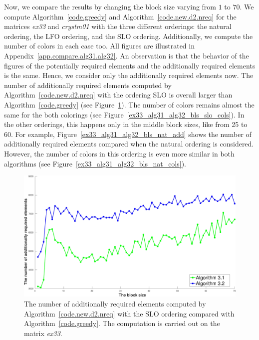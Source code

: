 \documentclass[12pt, twoside,a4paper,toc=bibliography]{scrbook}
\newcommand{\figref}[1]{Figure~\protect\ref{#1}}
\newcommand{\coderef}[1]{Algorithm~\protect\ref{#1}}
\newcommand{\appref}[1]{Appendix~\protect\ref{#1}}
\begin{document}
Now, we compare the results by changing the block size varying from $1$ to $70$.
We compute \coderef{code.greedy} and \coderef{code.new.d2.nreq} for the matrices \textit{ex33}
and \textit{crystm01} with the three different orderings: the natural ordering, the LFO ordering,
and the SLO ordering. Additionally, we compute the number of colors in each case too.
All figures are illustrated in \appref{app.compare.alg31.alg32}.
An observation is that the behavior of the figures of the potentially required elements and
the additionally required elements is the same. Hence, we consider only the additionally
required elements now.
The number of additionally required elements computed by \coderef{code.new.d2.nreq} with the ordering SLO
is overall larger than \coderef{code.greedy} (see \figref{ex33_alg31_alg32_bls_slo_add}).
The number of colors remains almost the same for the both colorings 
(see \figref{ex33_alg31_alg32_bls_slo_cols}). 
In the other orderings, this happens only in the middle block sizes, like from 25 to 60.
For example, \figref{ex33_alg31_alg32_bls_nat_add} shows the number of additionally required elements
compared when the natural ordering is considered.
However, the number of colors in this ordering is even more similar in both algorithms
(see \figref{ex33_alg31_alg32_bls_nat_cols}).

\begin{figure}
\centering
\includegraphics[width=0.9\linewidth]{ex33_alg31_alg32_bls_slo_add}
\caption{
The number of additionally required elements computed by
\coderef{code.new.d2.nreq} with the SLO ordering
compared with \coderef{code.greedy}.
The computation is carried out on the matrix \textit{ex33}. }
\label{ex33_alg31_alg32_bls_slo_add}
\end{figure}
\end{document}
